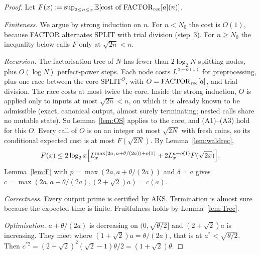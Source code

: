 \documentclass[11pt]{amsart}
\theoremstyle{definition}
\newcommand{\Ex}{\mathbb{E}}
\begin{document}
\begin{proof}
Let $F(x):=\sup_{2\le n\le x}\Ex[\text{cost of }\mathrm{FACTOR}_{\rm rec}[a](n)]$.

\emph{Finiteness.} We argue by strong induction on $n$. For $n<N_0$ the cost is $O(1)$, because FACTOR alternates SPLIT with trial division
(step~3). For $n\ge N_0$ the inequality below calls $F$ only at $\sqrt{2n}<n$.

\emph{Recursion.} The factorisation tree of $N$ has fewer than $2\log_2N$ splitting nodes, plus $O(\log N)$ perfect-power steps. Each node costs
$L^{a+o(1)}$ for preprocessing, plus one race between the core $\mathrm{SPLIT}^O$, with $O=\mathrm{FACTOR}_{\rm rec}[a]$, and trial division. The race costs at most
twice the core. Inside the strong induction, $O$ is applied only to inputs at most $\sqrt{2n}<n$, on which it is already known to be admissible
(exact, canonical output, almost surely terminating; nested calls share no mutable state). So Lemma~\ref{lem:OS} applies to the core, and
(A1)--(A3) hold for this $O$. Every call of $O$ is on an integer
at most $\sqrt{2N}$ with fresh coins, so its conditional expected cost is at most $F(\sqrt{2N})$. By Lemma~\ref{lem:waldrec},
\[
F(x)\le2\log_2x\Bigl[L_x^{\max(2a,\,a+\theta/(2a))+o(1)}+2L_x^{a+o(1)}F(\sqrt{2x})\Bigr].
\]
Lemma~\ref{lem:F} with $p=\max(2a,a+\theta/(2a))$ and $\delta=a$ gives $c=\max(2a,a+\theta/(2a),(2+\sqrt2)a)=c(a)$.

\emph{Correctness.} Every output prime is certified by AKS. Termination is almost sure because the expected time is finite. Fruitfulness
holds by Lemma~\ref{lem:Trec}.

\emph{Optimisation.} $a+\theta/(2a)$ is decreasing on $(0,\sqrt{\theta/2}]$ and $(2+\sqrt2)a$ is increasing. They meet where
$(1+\sqrt2)a=\theta/(2a)$, that is at $a^*<\sqrt{\theta/2}$. Then $c^{*2}=(2+\sqrt2)^2(\sqrt2-1)\theta/2=(1+\sqrt2)\theta$.
\end{proof}
\end{document}
